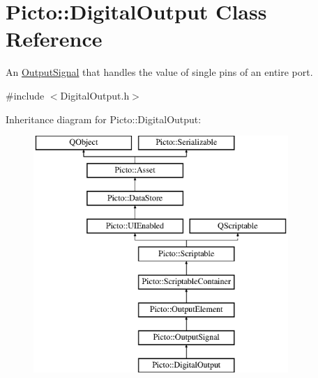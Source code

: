 \hypertarget{class_picto_1_1_digital_output}{\section{Picto\-:\-:Digital\-Output Class Reference}
\label{class_picto_1_1_digital_output}
}


An \hyperlink{struct_picto_1_1_output_signal}{Output\-Signal} that handles the value of single pins of an entire port.  




{\ttfamily \#include $<$Digital\-Output.\-h$>$}

Inheritance diagram for Picto\-:\-:Digital\-Output\-:\begin{figure}[H]
\begin{center}
\leavevmode
\includegraphics[height=9.000000cm]{class_picto_1_1_digital_output}
\end{center}
\end{figure}

